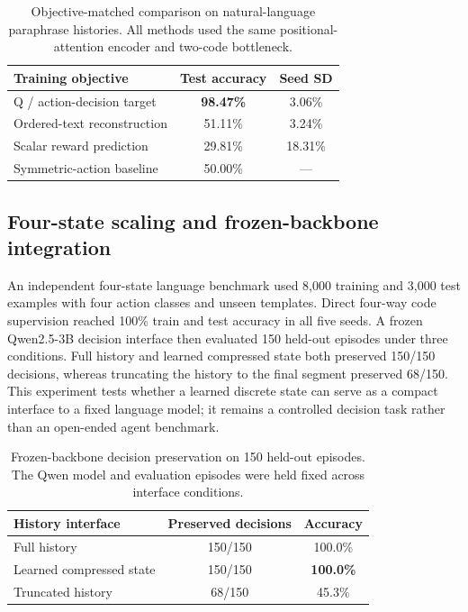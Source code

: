 \documentclass[11pt]{article}
\newcommand{\qwen}{Qwen2.5}
\begin{document}
\begin{table}[t]
\centering
\caption{Objective-matched comparison on natural-language paraphrase histories. All methods used the same positional-attention encoder and two-code bottleneck.}
\label{tab:objectives}
\begin{tabular}{@{}lcc@{}}
\toprule
Training objective & Test accuracy & Seed SD\\
\midrule
Q / action-decision target & \textbf{98.47\%} & 3.06\%\\
Ordered-text reconstruction & 51.11\% & 3.24\%\\
Scalar reward prediction & 29.81\% & 18.31\%\\
Symmetric-action baseline & 50.00\% & ---\\
\bottomrule
\end{tabular}
\end{table}

\subsection{Four-state scaling and frozen-backbone integration}
An independent four-state language benchmark used 8,000 training and 3,000 test examples with four action classes and unseen templates. Direct four-way code supervision reached 100\% train and test accuracy in all five seeds. A frozen \qwen-3B decision interface then evaluated 150 held-out episodes under three conditions. Full history and learned compressed state both preserved 150/150 decisions, whereas truncating the history to the final segment preserved 68/150. This experiment tests whether a learned discrete state can serve as a compact interface to a fixed language model; it remains a controlled decision task rather than an open-ended agent benchmark.

\begin{table}[t]
\centering
\caption{Frozen-backbone decision preservation on 150 held-out episodes. The Qwen model and evaluation episodes were held fixed across interface conditions.}
\label{tab:qwen}
\begin{tabular}{@{}lcc@{}}
\toprule
History interface & Preserved decisions & Accuracy\\
\midrule
Full history & 150/150 & 100.0\%\\
Learned compressed state & 150/150 & \textbf{100.0\%}\\
Truncated history & 68/150 & 45.3\%\\
\bottomrule
\end{tabular}
\end{table}
\end{document}
